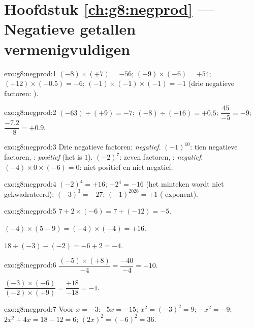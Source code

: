 \section*{Hoofdstuk \ref{ch:g8:negprod} --- Negatieve getallen vermenigvuldigen}

\begin{solution}{exo:g8:negprod:1}
$(-8) \times (+7) = -56$; \quad
$(-9) \times (-6) = +54$; \quad
$(+12) \times (-0.5) = -6$; \quad
$(-1) \times (-1) \times (-1) = -1$ (drie negatieve factoren: ).
\end{solution}

\begin{solution}{exo:g8:negprod:2}
$(-63) \div (+9) = -7$; \quad
$(-8) \div (-16) = +0.5$; \quad
$\dfrac{45}{-5} = -9$; \quad
$\dfrac{-7.2}{-8} = +0.9$.
\end{solution}

\begin{solution}{exo:g8:negprod:3}
Drie negatieve factoren: \emph{negatief}. \quad
$(-1)^{10}$: tien negatieve factoren, : \emph{positief} (het is $1$). \quad
$(-2)^7$: zeven factoren, : \emph{negatief}. \quad
$(-4) \times 0 \times (-6) = 0$: niet positief en niet negatief.
\end{solution}

\begin{solution}{exo:g8:negprod:4}
$(-2)^4 = +16$; \quad $-2^4 = -16$ (het minteken wordt niet gekwadrateerd); \quad
$(-3)^3 = -27$; \quad $(-1)^{2026} = +1$ ( exponent).
\end{solution}

\begin{solution}{exo:g8:negprod:5}
$7 + 2 \times (-6) = 7 + (-12) = -5$.

$(-4) \times (5 - 9) = (-4) \times (-4) = +16$.

$18 \div (-3) - (-2) = -6 + 2 = -4$.
\end{solution}

\begin{solution}{exo:g8:negprod:6}
$\dfrac{(-5) \times (+8)}{-4} = \dfrac{-40}{-4} = +10$.

$\dfrac{(-3) \times (-6)}{(-2) \times (+9)} = \dfrac{+18}{-18} = -1$.
\end{solution}

\begin{solution}{exo:g8:negprod:7}
Voor $x = -3$: \ $5x = -15$; \quad $x^2 = (-3)^2 = 9$; \quad $-x^2 = -9$; \quad
$2x^2 + 4x = 18 - 12 = 6$; \quad $(2x)^2 = (-6)^2 = 36$.
\end{solution}

